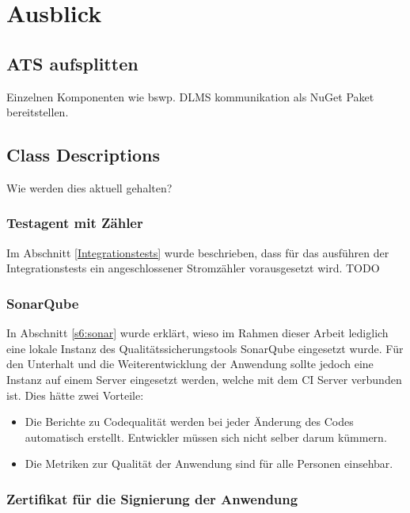
\chapter{Ausblick}

\section{ATS aufsplitten}\label{ausblick:ats_split}
Einzelnen Komponenten wie bswp. DLMS kommunikation als NuGet Paket bereitstellen.


\section{Class Descriptions}
Wie werden dies aktuell gehalten?


\subsection{Testagent mit Zähler}
Im Abschnitt \ref{Integrationstests} wurde beschrieben, dass für das ausführen der Integrationstests ein angeschlossener Stromzähler vorausgesetzt wird.
TODO

\subsection{SonarQube}
In Abschnitt \ref{s6:sonar} wurde erklärt, wieso im Rahmen dieser Arbeit lediglich eine lokale Instanz des Qualitätssicherungstools SonarQube eingesetzt wurde.
Für den Unterhalt und die Weiterentwicklung der Anwendung sollte jedoch eine Instanz auf einem Server eingesetzt werden, welche mit dem \ac{CI} Server verbunden ist.
Dies hätte zwei Vorteile:
\begin{itemize}
   \item Die Berichte zu Codequalität werden bei jeder Änderung des Codes automatisch erstellt. 
Entwickler müssen sich nicht selber darum kümmern.
   \item Die Metriken zur Qualität der Anwendung sind für alle Personen einsehbar.
\end{itemize}

\subsection{Zertifikat für die Signierung der Anwendung}\label{ausblick:cert}